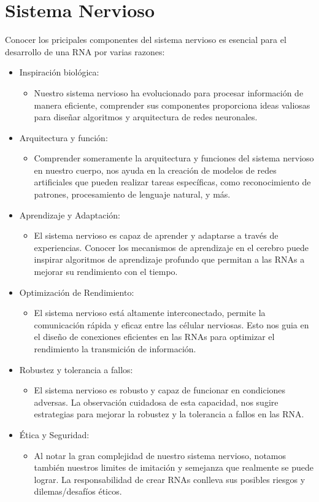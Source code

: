 \section{Sistema Nervioso}

Conocer los pricipales componentes del sistema nervioso es esencial para el desarrollo de una RNA por varias razones:
\begin{itemize}
 \item Inspiración biológica:
    \begin{itemize}
    \item Nuestro sistema nervioso ha evolucionado para procesar información de manera eficiente, comprender sus componentes proporciona ideas valiosas para diseñar algoritmos y arquitectura de redes neuronales. 
    \end{itemize}
 \item Arquitectura y función:
    \begin{itemize}
    \item Comprender someramente la arquitectura y funciones del sistema nervioso en nuestro cuerpo, nos ayuda en la creación de modelos de redes artificiales que pueden realizar tareas específicas, como reconocimiento de patrones, procesamiento de lenguaje natural, y más.
    \end{itemize} 
 \item Aprendizaje y Adaptación:
    \begin{itemize}
    \item El sistema nervioso es capaz de aprender y adaptarse a través de experiencias. Conocer los mecanismos de aprendizaje en el cerebro puede inspirar algoritmos de aprendizaje profundo que permitan a las RNAs a mejorar su rendimiento con el tiempo.
    \end{itemize}
 \item Optimización de Rendimiento:
    \begin{itemize}
    \item El sistema nervioso está altamente interconectado, permite la comunicación rápida y eficaz entre las célular nerviosas. Esto nos guia en el diseño de conexiones eficientes en las RNAs para optimizar el rendimiento la transmición de información.
    \end{itemize}
 \item Robustez y tolerancia a fallos:
    \begin{itemize}
    \item El sistema nervioso es robusto y capaz de funcionar en condiciones adversas. La observación cuidadosa de esta capacidad, nos sugire estrategias para mejorar la robustez y la tolerancia a fallos en las RNA.
    \end{itemize}
 \item Ética y Seguridad:
    \begin{itemize}
    \item Al notar la gran complejidad de nuestro sistema nervioso, notamos también nuestros limites de imitación y semejanza que realmente se puede lograr. La responsabilidad de crear RNAs conlleva sus posibles riesgos y dilemas/desafíos éticos. 
    \end{itemize}
\end{itemize}


